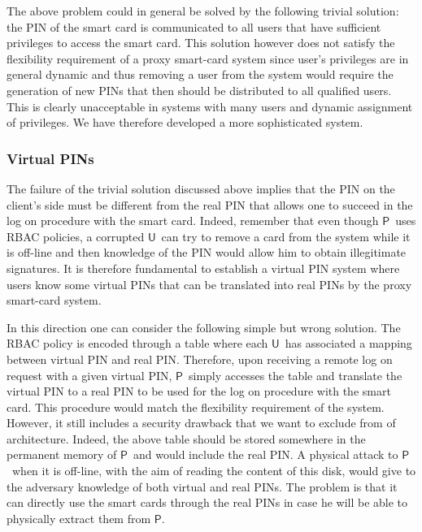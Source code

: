 \documentclass{sig-alternate}
\newcommand{\User}{\ensuremath{\mathsf{U}}}
\newcommand{\Proxy}{\ensuremath{\mathsf{P}}}
\begin{document}
The above problem could in general be solved by the following trivial solution: the PIN of the smart card is communicated to all users that have sufficient privileges to access the smart card. This solution however does not satisfy the flexibility requirement of a proxy smart-card system since user's privileges are in general dynamic and thus removing a user from the system would require the generation of new PINs that then should be distributed to all qualified users. This is clearly unacceptable in systems with many users and dynamic assignment of privileges. We have therefore developed a more sophisticated system.

\subsubsection{Virtual PINs}
The failure of the trivial solution discussed above implies that the PIN on the client's side must be different from the real PIN that allows one to succeed in the log on procedure with the smart card. Indeed, remember that even though \Proxy\ uses RBAC policies, a corrupted \User\ can try to remove a card from the system while it is off-line and then knowledge
of the PIN would allow him to obtain illegitimate signatures. It is therefore fundamental to establish a virtual PIN system where users know some virtual PINs that can be translated into real PINs by the proxy smart-card system.

In this direction one can consider the following simple but wrong solution. The RBAC policy is encoded through a table where each \User\ has associated a mapping
between virtual PIN and real PIN. Therefore, upon receiving a remote log on request with a given virtual PIN, \Proxy\  simply accesses the table and translate the virtual PIN to a real PIN to be used for the log on procedure with the smart card. This procedure would match the flexibility requirement of the system. However, it still includes a security drawback that we want to exclude from of architecture. Indeed, the above table should be stored somewhere in the permanent memory of \Proxy\ and would include the real PIN.
A physical attack to \Proxy\ when it is off-line, with the aim of reading the content of this disk, would give to the adversary knowledge of both virtual and real PINs. The problem is that it can directly use the smart cards through the real PINs in case he will be able to physically extract them from \Proxy.
\end{document}
